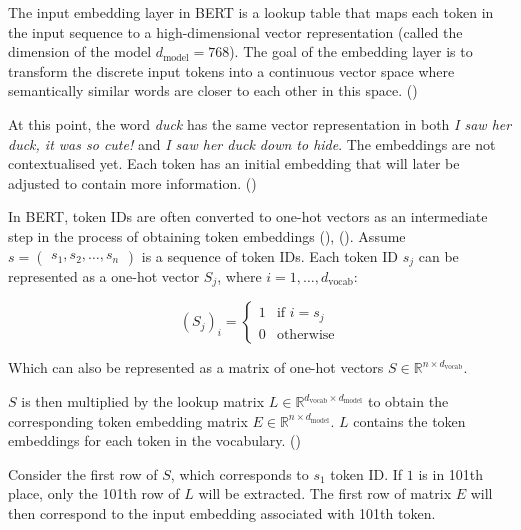 The input embedding layer in BERT is a lookup table that maps each token in the input sequence to a high-dimensional vector representation (called the dimension of the model $d_\text{model} = 768$). The goal of the embedding layer is to transform the discrete input tokens into a continuous vector space where semantically similar words are closer to each other in this space. (\cite{rohrer_transformers_2021})

At this point, the word \textit{duck} has the same vector representation in both \textit{I saw her duck, it was so cute!} and \textit{I saw her duck down to hide}. The embeddings are not contextualised yet. Each token has an initial embedding that will later be adjusted to contain more information. (\cite{geron_hands-machine_2019})

In BERT, token IDs are often converted to one-hot vectors as an intermediate step in the process of obtaining token embeddings (\cite{tunstall_natural_2022}), (\cite{rohrer_transformers_2021}). Assume $ s = \begin{pmatrix} s_1 , s_2 , \dots , s_n \end{pmatrix} $ is a sequence of token IDs. Each token ID $s_j$ can be represented as a one-hot vector $S_j$, where $i = 1, \dots, d_{\text{vocab}}$:

$$ (S_j)_i = \begin{cases} 1 & \text{if } i = s_j \\ 0 & \text{otherwise} \end{cases} $$

Which can also be represented as a matrix of one-hot vectors $S \in \mathbb{R}^{n \times d_{\text{vocab}}}$.

$S$ is then multiplied by the lookup matrix $ L \in \mathbb{R}^{d_{\text{vocab}} \times d_{\text{model}}}$ to obtain the corresponding token embedding matrix $E \in \mathbb{R}^{n \times d_{\text{model}}}$.
$L$ contains the token embeddings for each token in the vocabulary. (\cite{geron_hands-machine_2019})

Consider the first row of $S$, which corresponds to $s_1$ token ID. If $1$ is in 101th place, only the 101th row of $L$ will be extracted. The first row of matrix $E$ will then correspond to the input embedding associated with 101th token.

